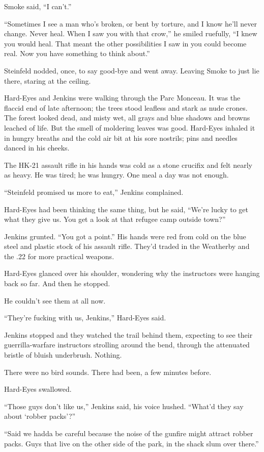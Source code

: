 Smoke said, ``I can't.''

``Sometimes I see a man who's broken, or bent by torture, and I know he'll never change. Never heal. When I saw you with that crow,'' he smiled ruefully, ``I knew you would heal. That meant the other possibilities I saw in you could become real. Now you have something to think about.''

Steinfeld nodded, once, to say good-bye and went away. Leaving Smoke to just lie there, staring at the ceiling.

Hard-Eyes and Jenkins were walking through the Parc Monceau. It was the flaccid end of late afternoon; the trees stood leafless and stark as nude crones. The forest looked dead, and misty wet, all grays and blue shadows and browns leached of life. But the smell of moldering leaves was good. Hard-Eyes inhaled it in hungry breaths and the cold air bit at his sore nostrils; pins and needles danced in his cheeks.

The HK-21 assault rifle in his hands was cold as a stone crucifix and felt nearly as heavy. He was tired; he was hungry. One meal a day was not enough.

``Steinfeld promised us more to eat,'' Jenkins complained.

Hard-Eyes had been thinking the same thing, but he said, ``We're lucky to get what they give us. You get a look at that refugee camp outside town?''

Jenkins grunted. ``You got a point.'' His hands were red from cold on the blue steel and plastic stock of his assault rifle. They'd traded in the Weatherby and the .22 for more practical weapons.

Hard-Eyes glanced over his shoulder, wondering why the instructors were hanging back so far. And then he stopped.

He couldn't see them at all now.

``They're fucking with us, Jenkins,'' Hard-Eyes said.

Jenkins stopped and they watched the trail behind them, expecting to see their guerrilla-warfare instructors strolling around the bend, through the attenuated bristle of bluish underbrush. Nothing.

There were no bird sounds. There had been, a few minutes before.

Hard-Eyes swallowed.

``Those guys don't like us,'' Jenkins said, his voice hushed. ``What'd they say about ‘robber packs'?''

``Said we hadda be careful because the noise of the gunfire might attract robber packs. Guys that live on the other side of the park, in the shack slum over there.''

